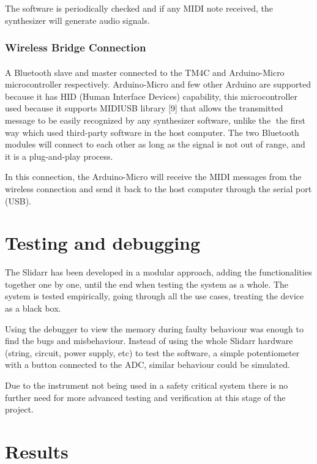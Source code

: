 \documentclass{article}
\begin{document}
The software is periodically checked and if any MIDI note received, the synthesizer will generate audio signals.

\subsubsection{Wireless Bridge Connection}
\paragraph{}A Bluetooth slave and master connected to the TM4C and Arduino-Micro microcontroller respectively. Arduino-Micro and few other Arduino are supported because it has HID (Human Interface Devices) capability, this microcontroller used because it supports MIDIUSB library [9] that allows the transmitted message to be easily recognized by any synthesizer software, unlike the the first way which used third-party software in the host computer. The two Bluetooth modules will connect to each other as long as the signal is not out of range, and it is a plug-and-play process.

In this connection, the Arduino-Micro will receive the MIDI messages from the wireless connection and send it back to the host computer through the serial port (USB). 

\section{Testing and debugging}
The Slidarr has been developed in a modular approach, adding the functionalities together one by one, until the end when testing the system as a whole. The system is tested empirically, going through all the use cases, treating the device as a black box.

Using the debugger to view the memory during faulty behaviour was enough to find the bugs and misbehaviour. Instead of using the whole Slidarr hardware (string, circuit, power supply, etc) to test the software, a simple potentiometer with a button connected to the ADC, similar behaviour could be simulated.

Due to the instrument not being used in a safety critical system there is no further need for more advanced testing and verification at this stage of the project.

\section{Results}
\end{document}
